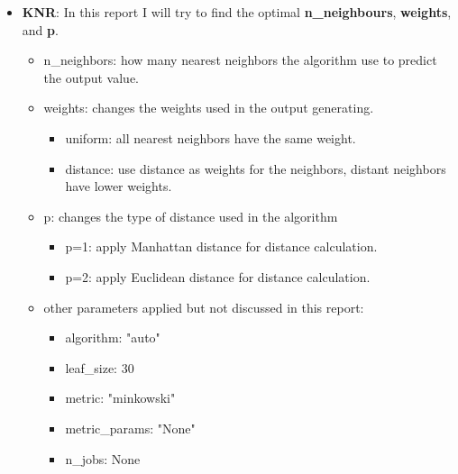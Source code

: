 \documentclass[a4paper]{article}
\begin{document}
\begin{itemize}
    \item \textbf{KNR}: In this report I will try to find the optimal \textbf{n\_neighbours}, \textbf{weights}, and \textbf{p}. 
    \begin{itemize}
        \item n\_neighbors: how many nearest neighbors the algorithm use to predict the output value.
        \item weights: changes the weights used in the output generating.
    
        \begin{itemize}
            \item uniform: all nearest neighbors have the same weight.
            \item distance: use distance as weights for the neighbors, distant neighbors have lower weights. 
        \end{itemize}

        \item p: changes the type of distance used in the algorithm
        \begin{itemize}
            \item p=1: apply Manhattan distance for distance calculation.
            \item p=2: apply Euclidean distance for distance calculation. 
        \end{itemize}
        \item other parameters applied but not discussed in this report: 
        \begin{itemize}
            \item algorithm: "auto"
            \item leaf\_size: 30
            \item metric: "minkowski"
            \item metric\_params: "None"
            \item n\_jobs: None
        \end{itemize}
        
    \end{itemize}


\end{itemize}
\end{document}
